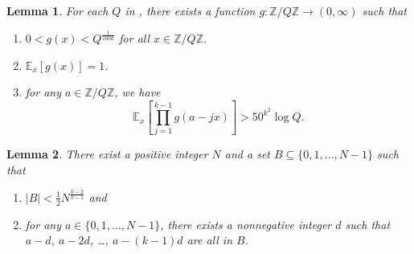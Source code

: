\documentclass[10pt,a4paper]{amsart}
\newtheorem{lemma}{Lemma}
\newcommand{\ZZ}{\mathbb Z}
\begin{document}
\begin{lemma}
\label{lem:smoothing}
For each $Q$ in ,
there exists a function $g : \ZZ/Q\ZZ\to (0,\infty)$
such that 
\begin{enumerate}[label=(\alph*)]
\item $0<g(x) < Q^{\frac 1{100k}}$ for all $x\in \ZZ/Q\ZZ$.
\item $\mathbb E_x[g(x)] = 1$.
\item for any $a\in \ZZ/Q\ZZ$, we have
$$\mathbb E_x\left[\prod_{j=1}^{k-1} g(a-jx)\right] > 50^{k^2}\log Q.$$
\end{enumerate}
\end{lemma}

\begin{lemma}
\label{lem:sampling}
There exist a positive integer $N$ 
and a set $B\subseteq \{0,1,\dots,N-1\}$
such that 
\begin{enumerate}[label=(\alph*)]
\item $|B| < \frac 12 N^{\frac{k-2}{k-1}}$ and 
\item for any $a\in \{0,1,\dots,N-1\}$, there exists 
a nonnegative integer $d$ such that
$a-d$, $a-2d$, \dots, $a-(k-1)d$ are all in $B$.
\end{enumerate}
\end{lemma}
\end{document}
